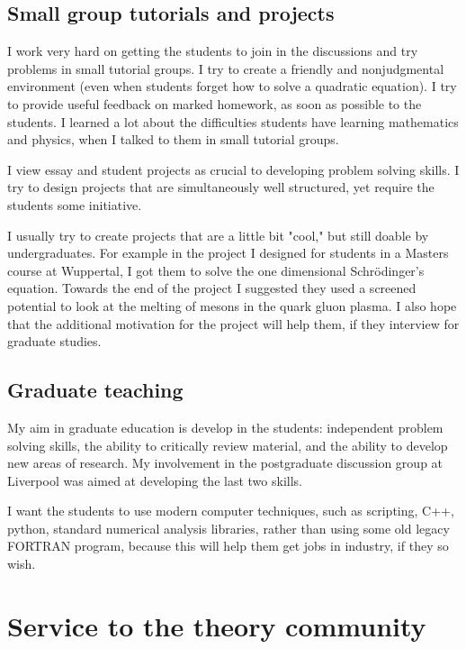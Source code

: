 \documentclass[12pt]{article}
\begin{document}
\subsection{Small group tutorials and projects}


I work very hard on getting the students to join in the discussions
and try problems in small tutorial groups. I try to create
a friendly and nonjudgmental environment (even when
students forget how to solve a quadratic equation).
I try to provide useful feedback on marked homework,
as soon as possible to the students. I learned a lot
about the difficulties students have learning mathematics
and physics, when I talked to them in small tutorial
groups.

I view essay and student projects as crucial to developing
problem solving skills. I try to design projects
that are simultaneously well structured, yet require
the students some initiative.

I usually try to create projects
that are a little bit "cool," but still doable by undergraduates.
For example in the project I designed for students
in a Masters course at Wuppertal, I got them to solve
the one dimensional Schr\"{o}dinger's equation. Towards the end
of the project I suggested they used a screened potential
to look at the melting of mesons in the quark gluon
plasma. I also hope that the additional motivation for the
project will help them,
if they interview for graduate studies.

\subsection{Graduate teaching}

My aim in graduate education is develop in the students:
independent problem solving skills, 
the ability to critically review material, and 
the ability to develop new areas of research. My 
involvement in the postgraduate discussion group at Liverpool
was aimed at developing the last two skills.

I want the students to use modern computer
techniques, such as scripting, C++, python, standard numerical
analysis libraries, rather than using some old legacy
FORTRAN program, because this will help them 
get jobs in industry, if they so wish.



\section{Service to the theory community}
\end{document}
